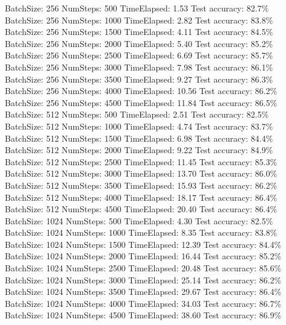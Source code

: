 \documentclass{article}
\begin{document}
\begin{itemize}
BatchSize: 256 NumSteps: 500 TimeElapsed: 1.53 Test accuracy: 82.7\% \\
BatchSize: 256 NumSteps: 1000 TimeElapsed: 2.82 Test accuracy: 83.8\% \\
BatchSize: 256 NumSteps: 1500 TimeElapsed: 4.11 Test accuracy: 84.5\% \\
BatchSize: 256 NumSteps: 2000 TimeElapsed: 5.40 Test accuracy: 85.2\% \\
BatchSize: 256 NumSteps: 2500 TimeElapsed: 6.69 Test accuracy: 85.7\% \\
BatchSize: 256 NumSteps: 3000 TimeElapsed: 7.98 Test accuracy: 86.1\% \\
BatchSize: 256 NumSteps: 3500 TimeElapsed: 9.27 Test accuracy: 86.3\% \\
BatchSize: 256 NumSteps: 4000 TimeElapsed: 10.56 Test accuracy: 86.2\% \\
BatchSize: 256 NumSteps: 4500 TimeElapsed: 11.84 Test accuracy: 86.5\% \\

BatchSize: 512 NumSteps: 500 TimeElapsed: 2.51 Test accuracy: 82.5\% \\
BatchSize: 512 NumSteps: 1000 TimeElapsed: 4.74 Test accuracy: 83.7\% \\
BatchSize: 512 NumSteps: 1500 TimeElapsed: 6.98 Test accuracy: 84.4\% \\
BatchSize: 512 NumSteps: 2000 TimeElapsed: 9.22 Test accuracy: 84.9\% \\
BatchSize: 512 NumSteps: 2500 TimeElapsed: 11.45 Test accuracy: 85.3\% \\
BatchSize: 512 NumSteps: 3000 TimeElapsed: 13.70 Test accuracy: 86.0\% \\
BatchSize: 512 NumSteps: 3500 TimeElapsed: 15.93 Test accuracy: 86.2\% \\
BatchSize: 512 NumSteps: 4000 TimeElapsed: 18.17 Test accuracy: 86.4\% \\
BatchSize: 512 NumSteps: 4500 TimeElapsed: 20.40 Test accuracy: 86.4\% \\

BatchSize: 1024 NumSteps: 500 TimeElapsed: 4.30 Test accuracy: 82.5\% \\
BatchSize: 1024 NumSteps: 1000 TimeElapsed: 8.35 Test accuracy: 83.8\% \\
BatchSize: 1024 NumSteps: 1500 TimeElapsed: 12.39 Test accuracy: 84.4\% \\
BatchSize: 1024 NumSteps: 2000 TimeElapsed: 16.44 Test accuracy: 85.2\% \\
BatchSize: 1024 NumSteps: 2500 TimeElapsed: 20.48 Test accuracy: 85.6\% \\
BatchSize: 1024 NumSteps: 3000 TimeElapsed: 25.14 Test accuracy: 86.2\% \\
BatchSize: 1024 NumSteps: 3500 TimeElapsed: 29.67 Test accuracy: 86.4\% \\
BatchSize: 1024 NumSteps: 4000 TimeElapsed: 34.03 Test accuracy: 86.7\% \\
BatchSize: 1024 NumSteps: 4500 TimeElapsed: 38.60 Test accuracy: 86.9\% \\


\end{itemize}
\end{document}

